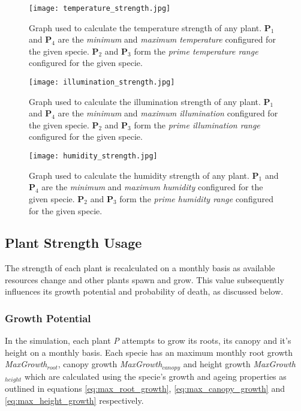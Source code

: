 \begin{figure}
\center
	\texttt{[image: temperature\_strength.jpg]}
	\caption{ Graph used to calculate the temperature strength of any plant. \textbf{P$_{1}$} and \textbf{P$_{4}$} are the \textit{minimum} and \textit{maximum temperature} configured for the given specie. \textbf{P$_{2}$} and \textbf{P$_{3}$} form the \textit{prime temperature range} configured for the given specie.  }	
	\label{fig:strength_calc_temp}
\end{figure}

\begin{figure}
\center
	\texttt{[image: illumination\_strength.jpg]}
	\caption{ Graph used to calculate the illumination strength of any plant. \textbf{P$_{1}$} and \textbf{P$_{4}$} are the \textit{minimum} and \textit{maximum illumination} configured for the given specie. \textbf{P$_{2}$} and \textbf{P$_{3}$} form the \textit{prime illumination range} configured for the given specie.  }	
	\label{fig:illumination_strength}
\end{figure}

\begin{figure}
\center
	\texttt{[image: humidity\_strength.jpg]}
	\caption{ Graph used to calculate the humidity strength of any plant. \textbf{P$_{1}$} and \textbf{P$_{4}$} are the \textit{minimum} and \textit{maximum humidity} configured for the given specie. \textbf{P$_{2}$} and \textbf{P$_{3}$} form the \textit{prime humidity range} configured for the given specie.  }	
	\label{fig:humidity_strength}
\end{figure}

\subsection{Plant Strength Usage}

The strength of each plant is recalculated on a monthly basis as available resources change and other plants spawn and grow. This value subsequently influences its growth potential and probability of death, as discussed below.

\subsubsection{Growth Potential}

In the simulation, each plant \textit{P} attempts to grow its roots, its canopy and it's height on a monthly basis. Each specie has an maximum monthly root growth \textit{MaxGrowth$_{root}$}, canopy growth \textit{MaxGrowth$_{canopy}$} and height growth \textit{MaxGrowth$_{height}$} which are calculated using the specie's growth and ageing properties as outlined in equations \ref{eq:max_root_growth}, \ref{eq:max_canopy_growth} and \ref{eq:max_height_growth} respectively.

